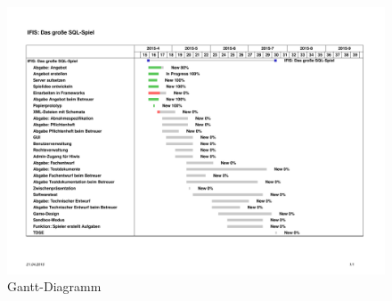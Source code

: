 \begin{figure}[ht]
\centering
\includegraphics[height=\textwidth, angle=90]{figures/gantt.pdf}
\caption{Gantt-Diagramm}
\label{gantt}
\end{figure}